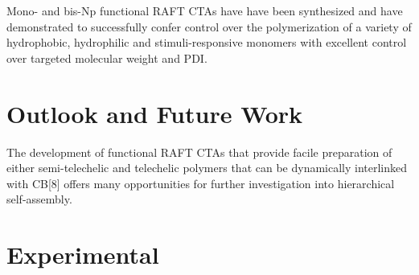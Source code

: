\documentclass[a4paper,12pt]{report} %
\begin{document}
Mono- and bis-Np functional RAFT CTAs have have been synthesized and have demonstrated to successfully confer control over the polymerization of a variety of hydrophobic, hydrophilic and stimuli-responsive monomers with excellent control over targeted molecular weight and PDI. 






\chapter{Outlook and Future Work}


The development of functional RAFT CTAs that provide facile preparation of either semi-telechelic and telechelic polymers that can be dynamically interlinked with CB[8] offers many opportunities for further investigation into hierarchical self-assembly.






\chapter{Experimental}
\end{document}

